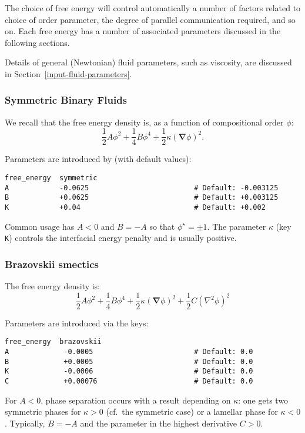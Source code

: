 The choice of free energy will control automatically a number of factors
related to choice of order parameter, the degree of parallel communication
required, and so on. Each free energy has a number of associated parameters
discussed in the following sections.

Details of general (Newtonian) fluid parameters, such as viscosity,
are discussed in Section~\ref{input-fluid-parameters}.

\subsubsection{Symmetric Binary Fluids}

We recall that the free energy density is, as a function of compositional
order $\phi$:
\[
{\textstyle \frac{1}{2}} A\phi^2 +
{\textstyle \frac{1}{4}} B\phi^4 +
{\textstyle \frac{1}{2}} \kappa (\mathbf{\nabla}\phi)^2.
\]

Parameters are introduced by (with default values):
\begin{lstlisting}
free_energy  symmetric
A            -0.0625                         # Default: -0.003125
B            +0.0625                         # Default: +0.003125
K            +0.04                           # Default: +0.002
\end{lstlisting}
Common usage has $A < 0$ and $B = -A$ so that $\phi^\star = \pm 1$.
The parameter $\kappa$
(key \texttt{K}) controls
the interfacial energy penalty and is usually positive.

\subsubsection{Brazovskii smectics}
\label{input-brazovskki-smectics}
The free energy density is:
\[
{\textstyle \frac{1}{2}} A\phi^2 +
{\textstyle \frac{1}{4}} B\phi^4 +
{\textstyle \frac{1}{2}} \kappa (\mathbf{\nabla}\phi)^2 +
{\textstyle \frac{1}{2}} C (\nabla^2 \phi)^2 
\]

Parameters are introduced via the keys:
\begin{lstlisting}
free_energy  brazovskii
A             -0.0005                        # Default: 0.0
B             +0.0005                        # Default: 0.0
K             -0.0006                        # Default: 0.0
C             +0.00076                       # Default: 0.0
\end{lstlisting}
For $A<0$, phase separation occurs with a result depending on $\kappa$:
one gets two symmetric phases for $\kappa >0$ (cf.\ the symmetric case)
or a lamellar phase for $\kappa < 0$. Typically, $B = -A$ and the
parameter in the highest derivative $C > 0$.

